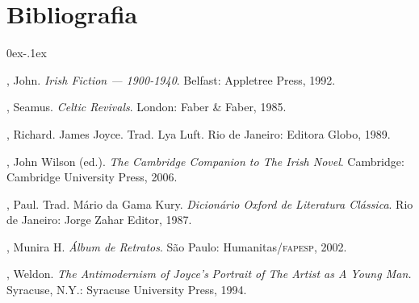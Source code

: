 \section{Bibliografia}

\begin{description}0ex\itemsep-.1ex
\newcommand{\tit}[1]{\item[\textnormal{\textsc{\MakeTextLowercase{#1}}}]}
\newcommand{\titidem}{\item[\line(1,0){25}]}

\tit{CRONIN}, John. \textit{Irish Fiction --- 1900-1940}. Belfast: Appletree
Press, 1992.

\tit{DEANE}, Seamus. \textit{Celtic Revivals}. London: Faber \& Faber, 1985.

\tit{ELMANN}, Richard. James Joyce. Trad. Lya Luft. Rio de Janeiro: Editora
Globo, 1989.

\tit{FOSTER}, John Wilson (ed.). \textit{The Cambridge Companion to The Irish
Novel}.  Cambridge: Cambridge University Press, 2006.

\tit{HARVEY}, Paul. Trad. Mário da Gama Kury. \textit{Dicionário Oxford de
\mbox{Literatura} Clássica}. Rio de Janeiro: Jorge Zahar Editor, 1987.

\tit{MUTRAN}, Munira H. \textit{Álbum de Retratos}. São Paulo:
Humanitas/\textsc{fapesp}, 2002.

\tit{THORNTON}, Weldon. \textit{The Antimodernism of Joyce’s}
\textit{Portrait of The Artist as A Young Man.} Syracuse,
N.Y.: Syracuse University Press, 1994.

\end{description}

